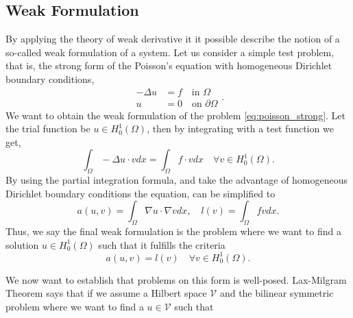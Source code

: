 \subsection{Weak Formulation}%
\label{sub:weak_formulation}

By applying the theory of weak derivative it it possible describe the notion of a so-called weak formulation of a system. Let us consider a simple test problem, that is, the strong form of the Poisson's equation with homogeneous Dirichlet boundary
conditions,
\begin{equation}
\label{eq:poisson_strong}
\begin{split}
-\Delta u & = f \quad \text{in } \Omega \\
u & =0 \quad \text{on } \partial \Omega
\end{split}
.\end{equation}
We want to obtain the weak formulation of the problem \eqref{eq:poisson_strong}. Let the trial function be $u \in H_{0}^{1}\left( \Omega  \right) $, then by integrating with a test function we get, \[
\int_{\Omega }^{} - \Delta u \cdot v dx = \int_{\Omega }^{} f \cdot v dx \quad \forall v \in H^{1}_{0}\left( \Omega  \right).
\]
By using the partial integration formula, and take the advantage of homogeneous Dirichlet boundary conditions the equation, can be simplified to \[
a\left( u,v \right) = \int_{\Omega }^{}  \nabla u\cdot \nabla v dx , \quad l\left( v \right)  = \int_{\Omega }^{}  f v dx.
\]
Thus, we say the final weak formulation is the problem where we want to find a solution $u \in H^{1}_{0}\left( \Omega  \right) $  such that it fulfills the criteria
\begin{equation}
\label{eq:poissons_weak_formulation}
a\left( u,v \right) = l\left( v \right) \quad \forall v \in H^{1}_{0}\left( \Omega  \right).
\end{equation}

We now want to establish that problems on this form is well-posed.
Lax-Milgram Theorem says that if we assume a Hilbert space $\mathcal{V} $ and the bilinear symmetric problem where we want to find a $u \in \mathcal{V} $  such that

